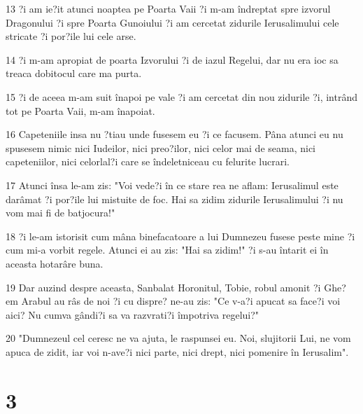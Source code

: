 \par 13 ?i am ie?it atunci noaptea pe Poarta Vaii ?i m-am îndreptat spre izvorul Dragonului ?i spre Poarta Gunoiului ?i am cercetat zidurile Ierusalimului cele stricate ?i por?ile lui cele arse.
\par 14 ?i m-am apropiat de poarta Izvorului ?i de iazul Regelui, dar nu era ioc sa treaca dobitocul care ma purta.
\par 15 ?i de aceea m-am suit înapoi pe vale ?i am cercetat din nou zidurile ?i, intrând tot pe Poarta Vaii, m-am înapoiat.
\par 16 Capeteniile insa nu ?tiau unde fusesem eu ?i ce facusem. Pâna atunci eu nu spusesem nimic nici Iudeilor, nici preo?ilor, nici celor mai de seama, nici capeteniilor, nici celorlal?i care se îndeletniceau cu felurite lucrari.
\par 17 Atunci însa le-am zis: "Voi vede?i în ce stare rea ne aflam: Ierusalimul este darâmat ?i por?ile lui mistuite de foc. Hai sa zidim zidurile Ierusalimului ?i nu vom mai fi de batjocura!"
\par 18 ?i le-am istorisit cum mâna binefacatoare a lui Dumnezeu fusese peste mine ?i cum mi-a vorbit regele. Atunci ei au zis: "Hai sa zidim!" ?i s-au întarit ei în aceasta hotarâre buna.
\par 19 Dar auzind despre aceasta, Sanbalat Horonitul, Tobie, robul amonit ?i Ghe?em Arabul au râs de noi ?i cu dispre? ne-au zis: "Ce v-a?i apucat sa face?i voi aici? Nu cumva gândi?i sa va razvrati?i împotriva regelui?"
\par 20 "Dumnezeul cel ceresc ne va ajuta, le raspunsei eu. Noi, slujitorii Lui, ne vom apuca de zidit, iar voi n-ave?i nici parte, nici drept, nici pomenire în Ierusalim".

\chapter{3}

